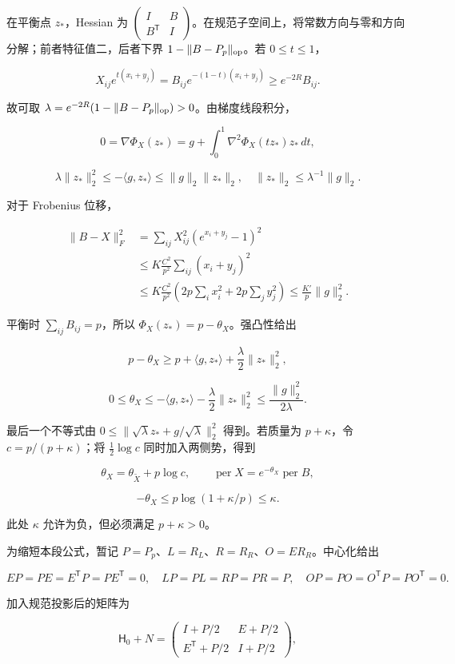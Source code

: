 \documentclass[11pt,a4paper]{article}
\begin{document}
在平衡点 \(z_*\)，Hessian 为 \(\left(\begin{smallmatrix}I&B\\B^{\mathsf T}&I\end{smallmatrix}\right)\)。在规范子空间上，将常数方向与零和方向分解；前者特征值二，后者下界 \(1-\|B-P_p\|_{\rm op}\)。若 \(0\le t\le1\)，

\[
X_{ij}e^{t(x_i+y_j)}=B_{ij}e^{-(1-t)(x_i+y_j)}\ge e^{-2R}B_{ij}.
\]

故可取 \(\lambda=e^{-2R}(1-\|B-P_p\|_{\rm op})>0\)。由梯度线段积分，

\[
0=\nabla\Phi_X(z_*)=g+\int_0^1\nabla^2\Phi_X(tz_*)z_*\,dt,
\]

\[
\lambda\|z_*\|_2^2\le-\langle g,z_*\rangle\le\|g\|_2\|z_*\|_2,
\quad\|z_*\|_2\le\lambda^{-1}\|g\|_2.
\]

对于 Frobenius 位移，

\[
\begin{aligned}
\|B-X\|_F^2
&=\sum_{ij}X_{ij}^2(e^{x_i+y_j}-1)^2\\
&\le K\frac{C^2}{p^2}\sum_{ij}(x_i+y_j)^2\\
&\le K\frac{C^2}{p^2}\left(2p\sum_ix_i^2+2p\sum_jy_j^2\right)
\le\frac{K'}p\|g\|_2^2.
\end{aligned}
\]

平衡时 \(\sum_{ij}B_{ij}=p\)，所以 \(\Phi_X(z_*)=p-\theta_X\)。强凸性给出

\[
p-\theta_X\ge p+\langle g,z_*\rangle+\frac\lambda2\|z_*\|_2^2,
\]

\[
0\le\theta_X\le-\langle g,z_*\rangle-\frac\lambda2\|z_*\|_2^2
\le\frac{\|g\|_2^2}{2\lambda}.
\]

最后一个不等式由 \(0\le\|\sqrt\lambda z_*+g/\sqrt\lambda\|_2^2\) 得到。若质量为 \(p+\kappa\)，令 \(c=p/(p+\kappa)\)；将 \(\tfrac12\log c\) 同时加入两侧势，得到

\[
\theta_X=\theta_{\widetilde X}+p\log c,\qquad
\operatorname{per}X=e^{-\theta_X}\operatorname{per}B,
\]

\[
-\theta_X\le p\log(1+\kappa/p)\le\kappa.
\]

此处 \(\kappa\) 允许为负，但必须满足 \(p+\kappa>0\)。

为缩短本段公式，暂记 \(P=P_p\)、\(L=R_L\)、\(R=R_R\)、\(O=ER_R\)。中心化给出

\[
EP=PE=E^{\mathsf T}P=PE^{\mathsf T}=0,\quad
LP=PL=RP=PR=P,\quad OP=PO=O^{\mathsf T}P=PO^{\mathsf T}=0.
\]

加入规范投影后的矩阵为

\[
\mathsf H_0+N=\begin{pmatrix}I+P/2&E+P/2\\E^{\mathsf T}+P/2&I+P/2\end{pmatrix},
\]
\end{document}
